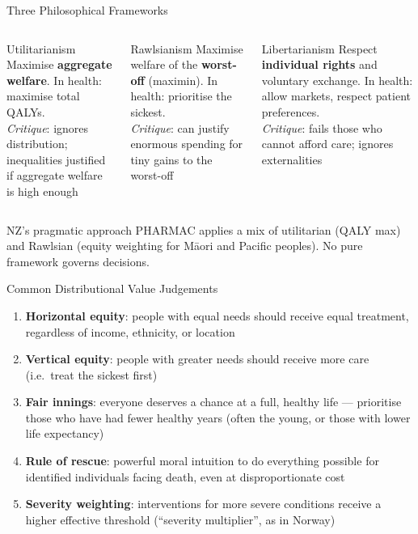 \documentclass[aspectratio=169, 12pt]{beamer}
\begin{document}
\begin{frame}{Three Philosophical Frameworks}
  \begin{columns}
      \begin{block}{Utilitarianism}
        \footnotesize Maximise \textbf{aggregate welfare}. In health: maximise total QALYs.\\[0.15em]
        \textit{Critique}: ignores distribution; inequalities justified if aggregate welfare is high enough
      \end{block}
      \begin{alertblock}{Rawlsianism}
        \footnotesize Maximise welfare of the \textbf{worst-off} (maximin). In health: prioritise the sickest.\\[0.15em]
        \textit{Critique}: can justify enormous spending for tiny gains to the worst-off
      \end{alertblock}
      \begin{block}{Libertarianism}
        \footnotesize Respect \textbf{individual rights} and voluntary exchange. In health: allow markets, respect patient preferences.\\[0.15em]
        \textit{Critique}: fails those who cannot afford care; ignores externalities
      \end{block}
  \end{columns}
  \vspace{0.15em}
  \begin{exampleblock}{NZ's pragmatic approach}
    \footnotesize PHARMAC applies a mix of utilitarian (QALY max) and Rawlsian (equity weighting for M\=aori and Pacific peoples). No pure framework governs decisions.
  \end{exampleblock}
\end{frame}

\begin{frame}{Common Distributional Value Judgements}
  \begin{enumerate}
    \item \textbf{Horizontal equity}: people with equal needs should receive equal treatment,
          regardless of income, ethnicity, or location
    \item \textbf{Vertical equity}: people with greater needs should receive more care
          (i.e.\ treat the sickest first)
    \item \textbf{Fair innings}: everyone deserves a chance at a full, healthy life ---
          prioritise those who have had fewer healthy years (often the young, or those with
          lower life expectancy)
    \item \textbf{Rule of rescue}: powerful moral intuition to do everything possible for
          identified individuals facing death, even at disproportionate cost
    \item \textbf{Severity weighting}: interventions for more severe conditions receive a
          higher effective threshold (``severity multiplier'', as in Norway)
  \end{enumerate}
\end{frame}
\end{document}

